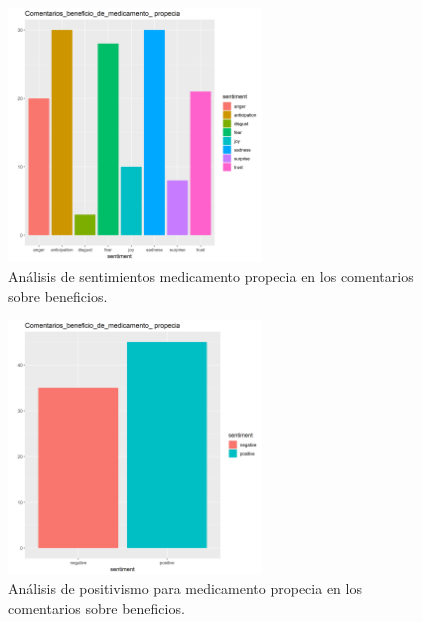 \documentclass[spanish,]{article}
\begin{document}
\begin{figure}[h]
    \centering
    \includegraphics[width=0.6\textwidth]{figuras/sentimientos/Apropecia1.png}
    \caption{Análisis de sentimientos medicamento propecia en los comentarios sobre beneficios.}
    \label{fig:sentimientos:33}
\end{figure}

\begin{figure}[h]
    \centering
    \includegraphics[width=0.6\textwidth]{figuras/sentimientos/Apropecia2.png}
    \caption{Análisis de positivismo para medicamento propecia en los comentarios sobre beneficios.}
    \label{fig:sentimientos:34}
\end{figure}
\end{document}
